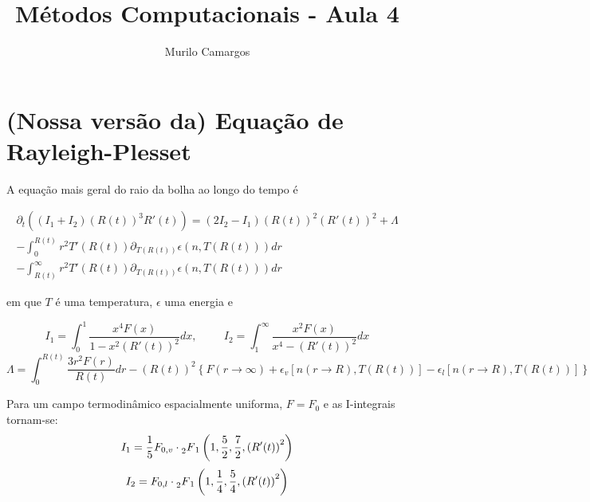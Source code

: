 \documentclass[10pt,a4paper]{article}
\author{Murilo Camargos}
\title{Métodos Computacionais - Aula 4}
\newcommand{\prt}[1]{\left(#1\right)}
\newcommand{\col}[1]{\left[#1\right]}
\newcommand{\chv}[1]{\left\{#1\right\}}
\newcommand{\hgf}[4]{\prescript{}{2}{F}_1\left(#1,#2,#3,#4\right)}
\begin{document}


	\section{(Nossa versão da) Equação de Rayleigh-Plesset}
	
	A equação mais geral do raio da bolha ao longo do tempo é
	
	\begin{equation}
	\begin{split}
	\partial_t\prt{\prt{I_1+I_2}\prt{R(t)}^3R'(t)} = \prt{2I_2-I_1}\prt{R(t)}^2\prt{R'(t)}^2 + \Lambda\\ - \int_0^{R(t)}{r^2T'\prt{R(t)}\partial_{T(R(t))}\epsilon\prt{n,T(R(t))}dr}\\ - \int_{R(t)}^\infty{r^2T'\prt{R(t)}\partial_{T(R(t))}\epsilon\prt{n,T(R(t))}dr}
	\end{split}
	\end{equation}
	
	em que $T$ é uma temperatura, $\epsilon$ uma energia e
	
	\[I_1 = \int_0^1{\frac{x^4F(x)}{1-x^2(R'(t))^2}dx}, \hspace{1cm} I_2 = \int_1^\infty{\frac{x^2F(x)}{x^4-(R'(t))^2}dx}\]
	\[\Lambda = \int_0^{R(t)}{\frac{3r^2F(r)}{R(t)}dr} - \prt{R(t)}^2\chv{F(r\rightarrow\infty) + \epsilon_v\col{n(r\rightarrow R), T\prt{R(t)}} - \epsilon_l\col{n(r\rightarrow R), T(R(t))}}\]
	
	Para um campo termodinâmico espacialmente uniforma, $F=F_0$ e as I-integrais tornam-se:
	\[I_1 = \frac{1}{5}F_{0,v}\cdot\hgf{1}{\frac{5}{2}}{\frac{7}{2}}{\prt{R'(t)}^2}\]
	\[I_2 = F_{0,l}\cdot\hgf{1}{\frac{1}{4}}{\frac{5}{4}}{\prt{R'(t)}^2}\]
	
\end{document}
